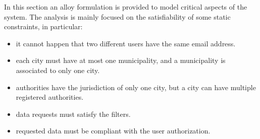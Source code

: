 In this section an alloy formulation is provided to model critical aspects of the system. The analysis is mainly focused on the satisfiability of some static constraints, in particular:
\begin{itemize}
	\item it cannot happen that two different users have the same email address.
	\item each city must have at most one municipality, and a municipality is associated to only one city.
	\item authorities have the jurisdiction of only one city, but a city can have multiple registered authorities.
	\item data requests must satisfy the filters.
	\item requested data must be compliant with the user authorization. 
\end{itemize}

\vspace{10mm}

